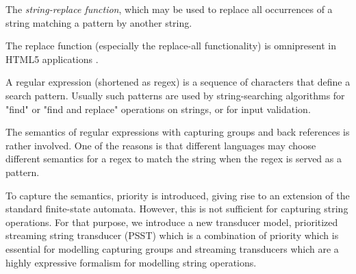 {%




%
%

The \emph{string-replace function}, 
which may be used to replace all occurrences of a string matching a pattern by 
another string. 

The replace function (especially 
the replace-all functionality) is omnipresent in HTML5 applications
\cite{LB16,TCJ16,YABI14}. 

A regular expression (shortened as regex) is a sequence of characters that define a search pattern. Usually such patterns are used by string-searching algorithms for "find" or "find and replace" operations on strings, or for input validation.  

The semantics of regular expressions with capturing groups and back references is rather involved. One of the reasons is that different languages may choose different semantics for a regex to match the string when the regex is served as a pattern. 

To capture the semantics, priority is introduced, giving rise to an extension of the standard finite-state automata. However, this is not sufficient for capturing string operations. For that purpose, we introduce  a new transducer model, prioritized streaming string transducer (PSST) which is a combination of priority which is essential for modelling capturing groups and streaming transducers which are a highly expressive formalism for modelling string operations. 
}
